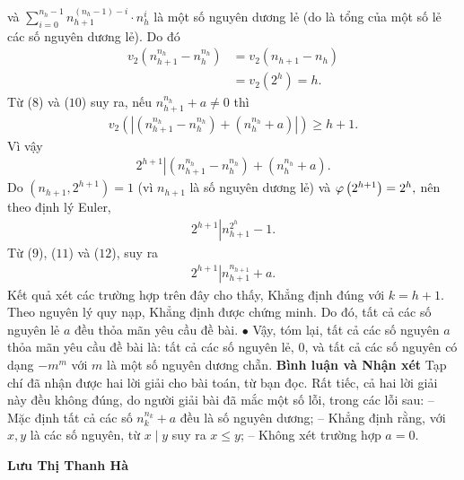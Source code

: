 \begin{multicols}{2}
	và $\sum\limits_{i = 0}^{{n_h} - 1} {n_{h + 1}^{\left( {{n_h} - 1} \right) - i} \cdot n_h^i}$  là một số nguyên dương lẻ (do là tổng của một số lẻ các số nguyên dương lẻ).
	\vskip 0.05cm
	Do đó
	\begin{align*}
		{v_2}\left( {n_{h + 1}^{{n_h}} - n_h^{{n_h}}} \right) &= {v_2}\left( {{n_{h + 1}} - {n_h}} \right) \\
		&= {v_2}\left( {{2^h}} \right) = h. \tag{$10$}
	\end{align*}
	Từ ($8$) và ($10$) suy ra, nếu  $n_{h + 1}^{{n_h}} + a \ne 0$ thì
	\begin{align*}
		{v_2}\left( {\left| {\left( {n_{h + 1}^{{n_h}} - n_h^{{n_h}}} \right) + \left( {n_h^{{n_h}} + a} \right)} \right|} \right) \ge h + 1.
	\end{align*}
	Vì vậy
	\begin{align*}
		{2^{h + 1}}\left| {\left( {n_{h + 1}^{{n_h}} - n_h^{{n_h}}} \right) + \left( {n_h^{{n_h}} + a} \right)} \right.. \tag{$11$}
	\end{align*}
	Do $\left( {{n_{h + 1}},{2^{h + 1}}} \right) = 1$  (vì ${n_{h + 1}}$  là số nguyên dương lẻ) và ${\rm{\varphi }}\left( {{2^{h + 1}}} \right) = {2^h},$  nên theo định lý Euler,
	\begin{align*}
		{2^{h + 1}}\left| {n_{h + 1}^{{2^h}} - 1} \right..\tag{$12$}
	\end{align*}
	Từ ($9$), ($11$) và ($12$), suy ra
	\begin{align*}
		{2^{h + 1}}\left| {n_{h + 1}^{{n_{h + 1}}} + a} \right..
	\end{align*}
	Kết quả xét các trường hợp trên đây cho thấy, Khẳng định đúng với $k = h + 1$.
	\vskip 0.05cm
	Theo nguyên lý quy nạp, Khẳng định được chứng minh.
	\vskip 0.05cm
	Do đó, tất cả các số nguyên lẻ $a$ đều thỏa mãn yêu cầu đề bài.
	\vskip 0.05cm
	$\bullet$ Vậy, tóm lại, tất cả các số nguyên $a$ thỏa mãn yêu cầu đề bài là: tất cả các số nguyên lẻ, $0$, và tất cả các số nguyên có dạng $-m^m$  với $m$ là một số nguyên dương chẵn.
	\vskip 0.05cm
	\textbf{\color{thachthuctoanhoc}Bình luận và Nhận xét}
	\vskip 0.05cm
	Tạp chí đã nhận được hai lời giải cho bài toán, từ bạn đọc. Rất tiếc, cả hai lời giải này đều không đúng, do người giải bài đã mắc một số lỗi, trong các lỗi sau:
	\vskip 0.05cm
	-- Mặc định tất cả các số $n_k^{{n_k}} + a$  đều là số nguyên dương;
	\vskip 0.05cm
	-- Khẳng định rằng, với $x, y$ là các số nguyên, từ $x \mid y$ suy ra $x \le y$;
	\vskip 0.05cm
	-- Không xét trường hợp $a = 0$.
	\begin{flushright}
		\textbf{\color{thachthuctoanhoc}Lưu Thị Thanh Hà}
	\end{flushright}
\end{multicols}
